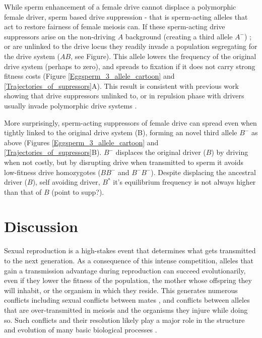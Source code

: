 \documentclass[12pt,letterpaper]{article}
\newcommand{\gc}[1]{{ \color{red} #1}}
\newcommand{\yb}[1]{{ \color{blue} #1}}
\begin{document}
While  sperm enhancement of a female drive cannot displace a polymorphic female driver, sperm based drive suppression - that is sperm-acting alleles that act to restore  fairness of female meiosis can. 
If these sperm-acting drive suppressors arise on
	the non-driving $A$ background (creating a third allele $A^{-}$) ;
	or are unlinked to the drive locus they readily invade a population segregating
	for the drive system ($AB$, see Figure). 
This allele lowers the frequency of the original drive system (perhaps to zero),
	and spreads to fixation if it does not carry strong fitness costs
	(Figure \ref{Eggsperm_3_allele_cartoon} and \ref{Trajectories_of_supressors}A). 
This result is consistent with previous work showing that drive suppressors unlinked to, or in repulsion phase with drivers usually invade polymorphic drive systems \citep[e.g. ][]{Brandvain2012}.  

More surprisingly, sperm-acting suppressors of female drive can spread
	even when tightly linked to the original drive system (B), forming
	an novel third allele $B^{-}$ as above 
	(Figures \ref{Eggsperm_3_allele_cartoon} and \ref{Trajectories_of_supressors}B). 
$B^{-}$ displaces the original driver ($B$) by driving when not costly, 
	but by disrupting drive when transmitted to sperm it avoids low-fitness drive homozygotes ($BB^-$ and $B^-B^-$). 
Despite displacing the ancestral driver ($B$), self avoiding driver, $B^*$ it's equilibrium frequency is not always higher than that of $B$ \yb{(point to supp?)}. 


\section*{Discussion}

Sexual reproduction is a high-stakes event that determines what gets transmitted to the next generation.  
As a consequence of this intense competition, alleles that gain a transmission advantage during reproduction 
	can succeed evolutionarily, even if they lower the 
        fitness of the population, 
	the mother whose offspring they will inhabit, 
	or the organism in which they reside. 
This generates numerous conflicts  \cite{Burt2006} including sexual conflicts between mates \cite{Arnqvist2005}, 
	and conflicts between alleles that are over-transmitted in meiosis and the organisms they injure while doing so. 
Such conflicts and their resolution likely play a major role in the structure and evolution of many basic biological processes \citep{Rice2013}.
\end{document}
